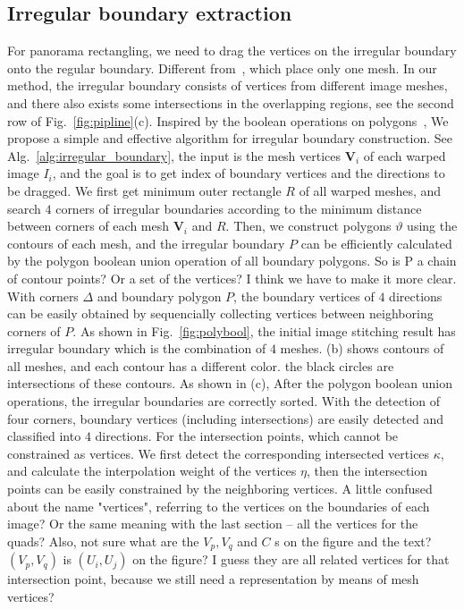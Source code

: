 \documentclass[10pt,journal,compsoc]{IEEEtran}
\newcommand{\zfl}[1]{{\color{red}#1}}
\begin{document}
 \subsection{Irregular boundary extraction}
 \label{sec:irregular_boundary}
For panorama rectangling, we need to drag the vertices on the irregular boundary onto the regular boundary.
Different from~\cite{journals/tog/HeC013}, which place only one mesh. In our method, the irregular boundary consists of vertices from different image meshes, and there also exists some intersections in the overlapping regions, see the second row of Fig.~\ref{fig:pipline}(c).
Inspired by the boolean operations on polygons~\cite{journals/gandc/MartinezRF09}, We propose a simple and effective algorithm for irregular boundary construction.
See Alg.~\ref{alg:irregular_boundary}, the input is the mesh vertices $\mathbf{V}_i$ of each warped image $I_i$, and the goal is to get index of boundary vertices and the directions to be dragged.
We first get minimum outer rectangle $R$ of all warped meshes, and search $4$ corners of irregular boundaries according to the minimum distance between corners of each mesh $\mathbf{V}_i$ and $R$.
Then, we construct polygons $\vartheta$  using the contours of each mesh, and the irregular boundary $P$ can be efficiently calculated by the polygon boolean union operation of all boundary polygons. 
\zfl{So is P a chain of contour points? Or a set of the vertices? I think we have to make it more clear.}
With corners $\Delta$ and boundary polygon $P$, the boundary vertices of $4$ directions can be easily obtained by sequencially collecting vertices between neighboring corners of $P$.
As shown in Fig.~\ref{fig:polybool}, the initial image stitching result has irregular boundary which is the combination of $4$ meshes.
(b) shows contours of all meshes, and each contour has a different color.  the black circles are intersections of these contours.
As shown in (c), After the polygon boolean union operations, the irregular boundaries are correctly sorted. With the detection of four corners, boundary vertices (including intersections) are easily detected and classified into $4$ directions.
For the intersection points, which cannot be constrained as vertices. We first detect the corresponding intersected vertices $\kappa$, and calculate the interpolation weight of the vertices $\eta$,
then the intersection points can be easily constrained by the neighboring vertices.
\zfl{A little confused about the name "vertices", referring to the vertices on the boundaries of each image? Or the same meaning with the last section -- all the vertices for the quads? Also,  not sure what are the $ V_p, V_q$ and $C$ s on the figure and the text? $(V_p, V_q)$ is $(U_i, U_j)$ on the figure? I guess they are all related vertices for that intersection point, because we still need a representation by means of mesh vertices?}
\end{document}
